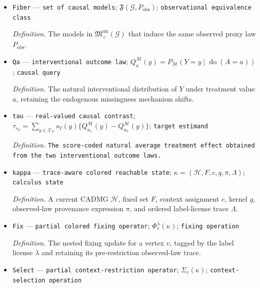 \documentclass{article}
\begin{document}
\begin{itemize}
  \par\smallskip\noindent\emph{Definition.} \texttt{The first interface exactly decides integer-\allowbreak{}polynomial signs at the observed-\allowbreak{}cell vector. The augmented interface also supplies the score coordinates as rational,\allowbreak{} real-\allowbreak{}algebraic with isolating data,\allowbreak{} or through an exact-\allowbreak{}real sign oracle on the concatenated vector.}
  \item \texttt{Fiber} --- \texttt{set of causal models}; \(\mathfrak F(\mathcal G,P_{\mathrm{obs}})\); \texttt{observational equivalence class}
  \par\smallskip\noindent\emph{Definition.} The models in \(\mathfrak M_{+}^{\mathrm{rm}}(\mathcal G)\) that induce the same observed proxy law \(P_{\mathrm{obs}}\).
  \item \texttt{Qa} --- \texttt{interventional outcome law}; \(Q_a^{\mathcal M}(y)=P_{\mathcal M}(Y=y\mid\operatorname{do}(A=a))\); \texttt{causal query}
  \par\smallskip\noindent\emph{Definition.} The natural interventional distribution of \(Y\) under treatment value \(a\), retaining the endogenous missingness mechanism shifts.
  \item \texttt{tau} --- \texttt{real-\allowbreak{}valued causal contrast}; \(\tau_{s_Y}=\sum_{y\in\mathcal X_Y}s_Y(y)\{Q_{a_1}^{\mathcal M}(y)-Q_{a_0}^{\mathcal M}(y)\}\); \texttt{target estimand}
  \par\smallskip\noindent\emph{Definition.} \texttt{The score-\allowbreak{}coded natural average treatment effect obtained from the two interventional outcome laws.}
  \item \texttt{kappa} --- \texttt{trace-\allowbreak{}aware colored reachable state}; \(\kappa=(\mathcal H,F,c,q,\pi,\Lambda)\); \texttt{calculus state}
  \par\smallskip\noindent\emph{Definition.} A current CADMG \(\mathcal H\), fixed set \(F\), context assignment \(c\), kernel \(q\), observed-law provenance expression \(\pi\), and ordered label-license trace \(\Lambda\).
  \item \texttt{Fix} --- \texttt{partial colored fixing operator}; \(\Phi_v^{\lambda}(\kappa)\); \texttt{fixing operation}
  \par\smallskip\noindent\emph{Definition.} The nested fixing update for a vertex \(v\), tagged by the label license \(\lambda\) and retaining its pre-restriction observed-law trace.
  \item \texttt{Select} --- \texttt{partial context-\allowbreak{}restriction operator}; \(\Sigma_c(\kappa)\); \texttt{context-\allowbreak{}selection operation}

\end{itemize}
\end{document}
